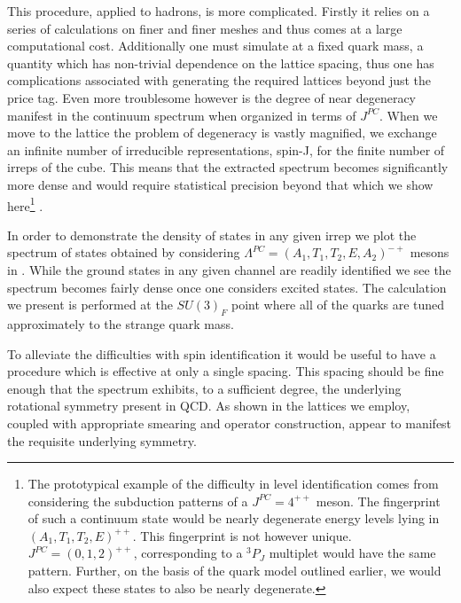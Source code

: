 This procedure, applied to hadrons, is more complicated. Firstly it relies on a series of calculations on finer and finer meshes and thus comes at a large computational cost. Additionally one must simulate at a fixed quark mass, a quantity which has non-trivial dependence on the lattice spacing, thus one has complications associated with generating the required lattices beyond just the price tag. Even more troublesome however is the degree of near degeneracy manifest in the continuum spectrum when organized in terms of $J^{PC}$. When we move to the lattice the problem of degeneracy is vastly magnified, we exchange an infinite number of irreducible representations, spin-J, for the finite number of irreps of the cube. This means that the extracted spectrum becomes significantly more dense and would require statistical precision beyond that which we show here\footnote{The prototypical example of the difficulty in level identification comes from considering the subduction patterns of a $J^{PC} = 4^{++}$ meson. The fingerprint of such a continuum state would be nearly degenerate energy levels lying in $(A_1,T_1,T_2,E)^{++}$. This fingerprint is not however unique. $J^{PC} = (0,1,2)^{++}$, corresponding to a $^3P_J$ multiplet would have the same pattern. Further, on the basis of the quark model outlined earlier, we would also expect these states to also be nearly degenerate.} .  

In order to demonstrate the density of states in any given irrep we plot the spectrum of states obtained by considering $\Lambda^{PC} = (A_1,T_1,T_2,E,A_2)^{-+}$ mesons in . While the ground states in any given channel are readily identified we see the spectrum becomes fairly dense once one considers excited states. The calculation we present is performed at the $SU(3)_F$ point where all of the quarks are tuned approximately to the strange quark mass. 


To alleviate the difficulties with spin identification it would be useful to have a procedure which is effective at only a single spacing. This spacing should be fine enough that the spectrum exhibits, to a sufficient degree, the underlying rotational symmetry present in QCD. As shown in  the lattices we employ, coupled with appropriate smearing and operator construction, appear to manifest the requisite underlying symmetry. 

